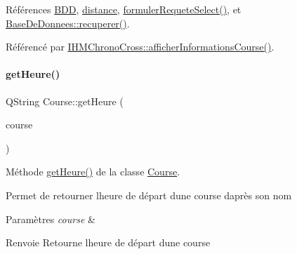 Références \hyperlink{class_course_a28a58b06494361b7a7eb81844d571dd4}{B\+DD}, \hyperlink{class_course_af2f7b814a0ec0d76291a2743c61615a8}{distance}, \hyperlink{class_course_a2ce9c62ead2c878a30af9d9c11b81644}{formuler\+Requete\+Select()}, et \hyperlink{class_base_de_donnees_a77539baad389f5acf754cd2cd452403e}{Base\+De\+Donnees\+::recuperer()}.



Référencé par \hyperlink{class_i_h_m_chrono_cross_afe18e84e4df15c15921f2bdcfc6f4396}{I\+H\+M\+Chrono\+Cross\+::afficher\+Informations\+Course()}.


\mbox{\label{class_course_afc21f8195edd50c9fd266cff0c401b7c}} 
\paragraph{\texorpdfstring{get\+Heure()}{getHeure()}}
{\footnotesize\ttfamily Q\+String Course\+::get\+Heure (\begin{DoxyParamCaption}\item[{Q\+String}]{course }\end{DoxyParamCaption})}



Méthode \hyperlink{class_course_afc21f8195edd50c9fd266cff0c401b7c}{get\+Heure()} de la classe \hyperlink{class_course}{Course}. 

Permet de retourner l\textquotesingle{}heure de départ d\textquotesingle{}une course d\textquotesingle{}après son nom 
\begin{DoxyParams}{Paramètres}
{\em course} & \\
\hline
\end{DoxyParams}
\begin{DoxyReturn}{Renvoie}
Retourne l\textquotesingle{}heure de départ d\textquotesingle{}une course 
\end{DoxyReturn}



